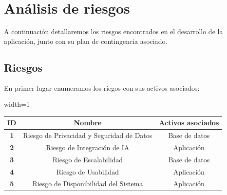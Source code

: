 \documentclass[a4paper,12pt]{article}
\begin{document}
    \newpage

    \section{Análisis de riesgos}
    \par A continuación detallaremos los riesgos encontrados en el desarrollo de la aplicación, junto con su plan de contingencia asociado.
    \subsection{Riesgos}
    \par En primer lugar enumeramos los riegos con sus activos asociados:
    \begin{center}
        \begin{adjustbox}{width=1\textwidth}
            \begin{tabular}{ |c|c|c| }
                \hline
                \rowcolor{lightgray} \textbf{ID} & \textbf{Nombre} & \textbf{Activos asociados} \\
                \hline    
                \textbf{1} & Riesgo de Privacidad y Seguridad de Datos & Base de datos \\
                \hline
                \textbf{2} & Riesgo de Integración de IA & Aplicación \\
                \hline
                \textbf{3} & Riesgo de Escalabilidad & Base de datos \\
                \hline
                \textbf{4} & Riesgo de Usabilidad & Aplicación \\
                \hline
                \textbf{5} & Riesgo de Disponibilidad del Sistema & Aplicación \\
                \hline
            \end{tabular}
        \end{adjustbox}
    \end{center}
\end{document}
